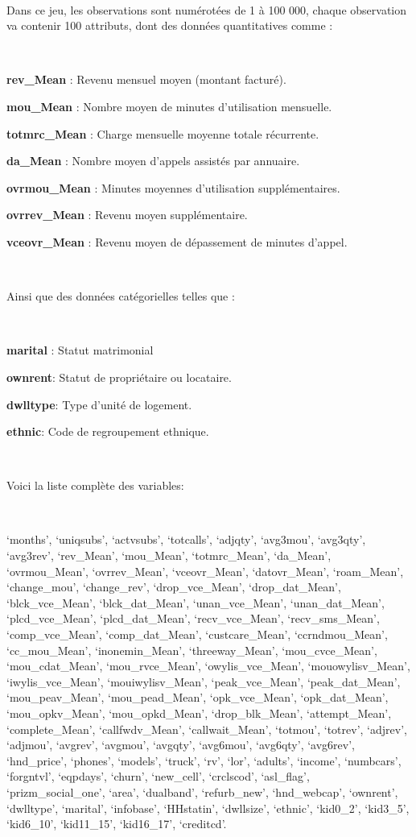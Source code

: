 \documentclass[]{imsart}
\numberwithin{equation}{section}
\theoremstyle{plain}
\begin{document}
~

Dans ce jeu, les observations sont numérotées de 1 à 100 000, chaque observation va contenir 100 attributs, dont des données quantitatives comme :

~

\textbf{rev\_Mean} : Revenu mensuel moyen (montant facturé).

\textbf{mou\_Mean} : Nombre moyen de minutes d'utilisation mensuelle.

\textbf{totmrc\_Mean} : Charge mensuelle moyenne totale récurrente.

\textbf{da\_Mean} : Nombre moyen d'appels assistés par annuaire.

\textbf{ovrmou\_Mean} : Minutes moyennes d'utilisation supplémentaires.

\textbf{ovrrev\_Mean} : Revenu moyen supplémentaire.

\textbf{vceovr\_Mean} : Revenu moyen de dépassement de minutes d'appel.

~

Ainsi que des données catégorielles telles que :

~

\textbf{marital} : Statut matrimonial

\textbf{ownrent}: Statut de propriétaire ou locataire.

\textbf{dwlltype}: Type d'unité de logement.

\textbf{ethnic}: Code de regroupement ethnique.

~

Voici la liste complète des variables:

~

`months', `uniqsubs', `actvsubs', `totcalls', `adjqty', `avg3mou', `avg3qty', `avg3rev', `rev\_Mean', `mou\_Mean', `totmrc\_Mean', `da\_Mean', `ovrmou\_Mean', `ovrrev\_Mean', `vceovr\_Mean', `datovr\_Mean', `roam\_Mean', `change\_mou', `change\_rev', `drop\_vce\_Mean', `drop\_dat\_Mean', `blck\_vce\_Mean', `blck\_dat\_Mean', `unan\_vce\_Mean', `unan\_dat\_Mean', `plcd\_vce\_Mean', `plcd\_dat\_Mean', `recv\_vce\_Mean', `recv\_sms\_Mean', `comp\_vce\_Mean', `comp\_dat\_Mean', `custcare\_Mean', `ccrndmou\_Mean', `cc\_mou\_Mean', `inonemin\_Mean', `threeway\_Mean', `mou\_cvce\_Mean', `mou\_cdat\_Mean', `mou\_rvce\_Mean', `owylis\_vce\_Mean', `mouowylisv\_Mean', `iwylis\_vce\_Mean', `mouiwylisv\_Mean', `peak\_vce\_Mean', `peak\_dat\_Mean', `mou\_peav\_Mean', `mou\_pead\_Mean', `opk\_vce\_Mean', `opk\_dat\_Mean', `mou\_opkv\_Mean', `mou\_opkd\_Mean', `drop\_blk\_Mean', `attempt\_Mean', `complete\_Mean', `callfwdv\_Mean', `callwait\_Mean', `totmou', `totrev', `adjrev', `adjmou', `avgrev', `avgmou', `avgqty', `avg6mou', `avg6qty', `avg6rev', `hnd\_price', `phones', `models', `truck', `rv', `lor', `adults', `income', `numbcars', `forgntvl', `eqpdays', `churn', `new\_cell', `crclscod', `asl\_flag', `prizm\_social\_one', `area', `dualband', `refurb\_new', `hnd\_webcap', `ownrent', `dwlltype', `marital', `infobase', `HHstatin', `dwllsize', `ethnic', `kid0\_2', `kid3\_5', `kid6\_10', `kid11\_15', `kid16\_17', `creditcd'.
\end{document}
